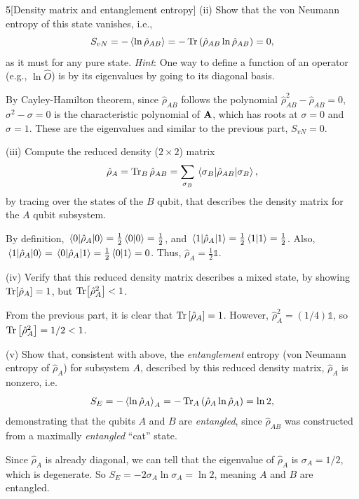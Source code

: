 \documentclass[12pt]{article}
\begin{document}
\begin{problem}{5}[Density matrix and entanglement entropy]
\qquad(ii) Show that the von Neumann entropy of this state vanishes, i.e.,
\begin{equation}
    S_{vN}=-\expval{\ln\hat\rho_{AB}}=-\Tr\qty(\hat\rho_{AB}\ln\hat\rho_{AB})=0, 
\end{equation}
as it must for any pure state. \textit{Hint}: One way to define a function of an
operator (e.g., $\ln\hat{O}$) is by its eigenvalues by going to its diagonal
basis.
\begin{solution}
By Cayley-Hamilton theorem, since $\hat\rho_{AB}$ follows the polynomial
$\hat\rho_{AB}^2-\hat\rho_{AB}=0$, $\sigma^2-\sigma=0$ is the characteristic
polynomial of $\vb{A}$, which has roots at $\sigma=0$ and $\sigma=1$. These are
the eigenvalues and similar to the previous part, $S_{vN}=0$.
\end{solution}

\qquad(iii) Compute the reduced density ($2\times2$) matrix
\begin{equation}
    \hat\rho_A=\Tr_B\hat\rho_{AB}=\sum_{\sigma_B}\ev{\hat\rho_{AB}}{\sigma_B}, 
\end{equation}
by tracing over the states of the $B$ qubit, that describes the density matrix
for the $A$ qubit subsystem.
\begin{solution}
By definition, $\mel{0}{\hat\rho_A}{0}=\frac12\ip{0}{0}=\frac12$, and
$\mel{1}{\hat\rho_A}{1}=\frac12\ip{1}{1}=\frac12$. Also,
$\mel{1}{\hat\rho_A}{0}=\mel{0}{\hat\rho_A}{1}=\frac12\ip{0}{1}=0$.
Thus, $\hat\rho_A=\frac12\mathbb{1}$.
\end{solution}

\qquad(iv) Verify that this reduced density matrix describes a mixed state, by
showing $\Tr[\hat\rho_A]=1$, but $\Tr[\hat\rho_A^2]<1$.
\begin{solution}
From the previous part, it is clear that $\Tr\qty[\hat\rho_A]=1$. However,
$\hat\rho_A^2=(1/4)\mathbb{1}$, so $\Tr\qty[\hat\rho_A^2]=1/2<1$. 
\end{solution}

\qquad(v) Show that, consistent with above, the \textit{entanglement} entropy
(von Neumann entropy of $\hat\rho_A$) for subsystem $A$, described by this
reduced density matrix, $\hat\rho_A$ is nonzero, i.e.
\begin{equation}
    S_E=-\expval{\ln\hat\rho_A}_A=-\Tr_A\qty(\hat\rho_A\ln\hat\rho_A)=\ln 2, 
\end{equation}
demonstrating that the qubits $A$ and $B$ are \textit{entangled}, since
$\hat\rho_{AB}$ was constructed from a maximally \textit{entangled} ``cat''
state.
\begin{solution}
    Since $\hat\rho_A$ is already diagonal, we can tell that the eigenvalue of
    $\hat\rho_A$ is $\sigma_A=1/2$, which is degenerate. So
        $S_E=-2\sigma_A\ln\sigma_A
        =\ln 2$, meaning $A$ and $B$ are entangled.
\end{solution}
\end{problem}
\newpage
    
\end{document}
